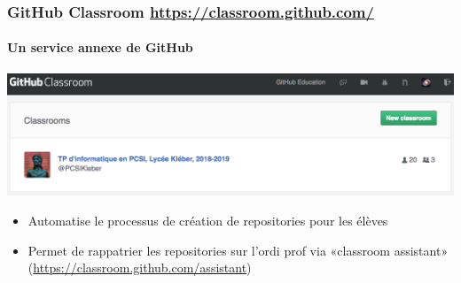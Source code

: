 \begin{frame}
	\frametitle{GitHub Classroom \url{https://classroom.github.com/}}
	\framesubtitle{Un service annexe de GitHub}

	\begin{center}
		\includegraphics[width=\linewidth]{figures/classroom_accueil.png}
	\end{center}

	\begin{itemize}[<+->]
		\item Automatise le processus de création de repositories pour les élèves

		\item Permet de rappatrier les repositories sur l'ordi prof via «classroom assistant» (\url{https://classroom.github.com/assistant})

	\end{itemize}



\end{frame}
